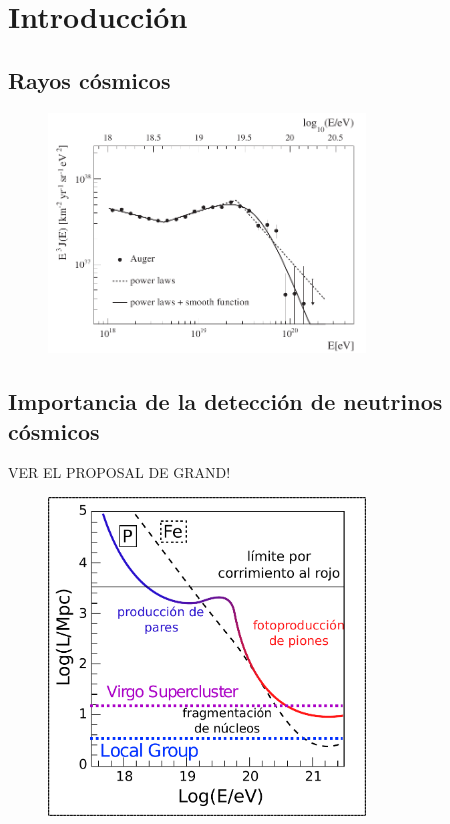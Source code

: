 \chapter{Introducci\'on}
\label{ch:intro}

\section{Rayos c\'osmicos}


	\begin{figure}[ht]
		\begin{center}
		\includegraphics[width=0.75\textwidth]{fig/introduccion/spectrum_withGZK}
		\caption{\label{fig:specGZK} }
		\end{center}
	\end{figure}
	
	\section{Importancia de la detecci\'on de neutrinos c\'osmicos}

	VER EL PROPOSAL DE GRAND!
	
\begin{figure}[ht]
	\begin{center}
	\includegraphics[width=0.75\textwidth]{fig/introduccion/proton_propaga_espanol}
	\caption{\label{fig:protProp} }
	\end{center}
\end{figure}


